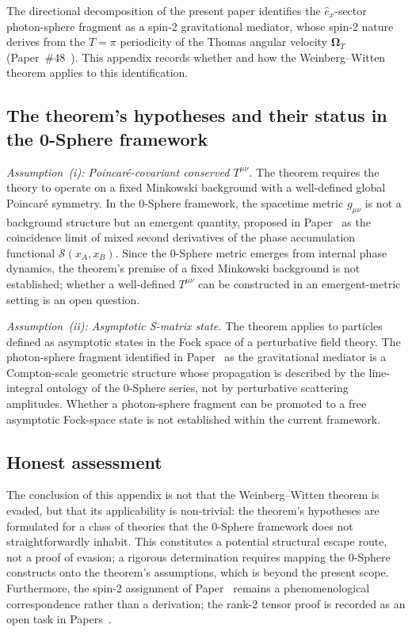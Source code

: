 \documentclass[%
 reprint, amsmath,amssymb, aps, prb, ]{revtex4-2}
\numberwithin{equation}{section}
\newcommand{\OmT}{\boldsymbol{\Omega}_T}
\newcommand{\ehat}[1]{\hat{e}_{#1}}
\begin{document}
The directional decomposition of the present paper identifies the $\ehat{x}$-sector photon-sphere fragment as a spin-2 gravitational mediator, whose spin-2 nature derives from the $T = \pi$ periodicity of the Thomas angular velocity $\OmT$ (Paper~\#48~\cite{hanamura48}). This appendix records whether and how the Weinberg--Witten theorem applies to this identification.

\subsection{The theorem's hypotheses and their status in the 0-Sphere framework}

\textit{Assumption~(i): Poincar\'{e}-covariant conserved $T^{\mu\nu}$.} The theorem requires the theory to operate on a fixed Minkowski background with a well-defined global Poincar\'{e} symmetry. In the 0-Sphere framework, the spacetime metric $g_{\mu\nu}$ is not a background structure but an emergent quantity, proposed in Paper~\cite{hanamura51} as the coincidence limit of mixed second derivatives of the phase accumulation functional $\mathcal{S}(x_A, x_B)$. Since the 0-Sphere metric emerges from internal phase dynamics, the theorem's premise of a fixed Minkowski background is not established; whether a well-defined $T^{\mu\nu}$ can be constructed in an emergent-metric setting is an open question.

\textit{Assumption~(ii): Asymptotic S-matrix state.} The theorem applies to particles defined as asymptotic states in the Fock space of a perturbative field theory. The photon-sphere fragment identified in Paper~\cite{hanamura49} as the gravitational mediator is a Compton-scale geometric structure whose propagation is described by the line-integral ontology of the 0-Sphere series, not by perturbative scattering amplitudes. Whether a photon-sphere fragment can be promoted to a free asymptotic Fock-space state is not established within the current framework.

\subsection{Honest assessment}

The conclusion of this appendix is not that the Weinberg--Witten theorem is evaded, but that its applicability is non-trivial: the theorem's hypotheses are formulated for a class of theories that the 0-Sphere framework does not straightforwardly inhabit. This constitutes a potential structural escape route, not a proof of evasion; a rigorous determination requires mapping the 0-Sphere constructs onto the theorem's assumptions, which is beyond the present scope. Furthermore, the spin-2 assignment of Paper~\cite{hanamura48} remains a phenomenological correspondence rather than a derivation; the rank-2 tensor proof is recorded as an open task in Papers~\cite{hanamura48,hanamura49}.

\clearpage
\end{document}
